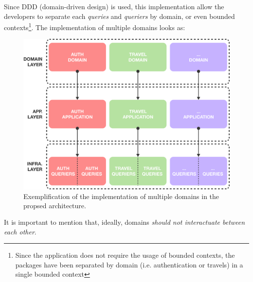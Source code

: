 \documentclass[../design.tex]{subfiles}
\begin{document}
Since DDD (domain-driven design) is used, this implementation allow the
developers to separate each \emph{queries} and \emph{queriers} by domain, or
even bounded contexts\footnote{Since the application does not require the usage
	of bounded contexts, the packages have been separated by domain (i.e.
	authentication or travels) in a single bounded context}. The implementation of
multiple domains looks as:
\begin{figure}[H]
	\centering
	\includegraphics[width=\textwidth]{./assets/core-multi-domain.png}
	\caption{Exemplification of the implementation of multiple domains in the
		propsed architecture.}
\end{figure}
It is important to mention that, ideally, domains \emph{should not interactuate
	between each other}.
\end{document}
